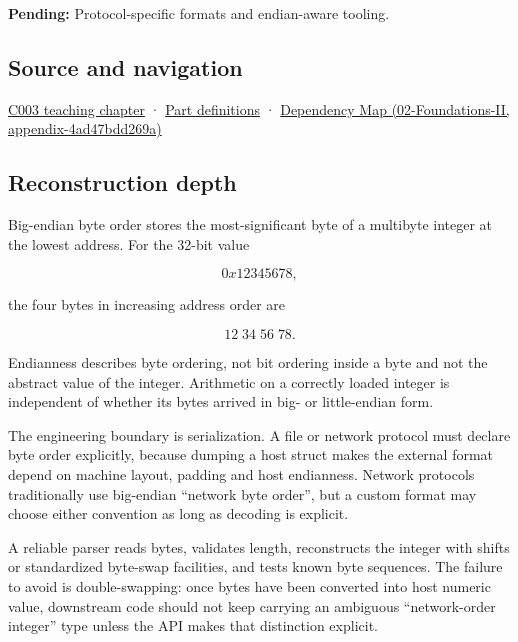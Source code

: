 \textbf{Pending:} Protocol-specific formats and endian-aware tooling.

\subsection{Source and navigation}\label{appendix-92e040df969a-source-and-navigation}

\hyperref[01-foundations-i-ch002-where-the-bytes-live]{C003 teaching chapter} · \hyperref[appendix-fd090d982a15-m003---parts-41-60]{Part definitions} · \href{../02-Foundations-II/main.pdf\#nameddest=appendix-4ad47bdd269a}{Dependency Map (02-Foundations-II, appendix-4ad47bdd269a)}

\subsection{Reconstruction depth}\label{appendix-92e040df969a-reconstruction-depth}

Big-endian byte order stores the most-significant byte of a multibyte integer at the lowest address. For the 32-bit value

\[
0x12345678,
\]

the four bytes in increasing address order are

\[
12\;34\;56\;78.
\]

Endianness describes byte ordering, not bit ordering inside a byte and not the abstract value of the integer. Arithmetic on a correctly loaded integer is independent of whether its bytes arrived in big- or little-endian form.

The engineering boundary is serialization. A file or network protocol must declare byte order explicitly, because dumping a host struct makes the external format depend on machine layout, padding and host endianness. Network protocols traditionally use big-endian ``network byte order'', but a custom format may choose either convention as long as decoding is explicit.

A reliable parser reads bytes, validates length, reconstructs the integer with shifts or standardized byte-swap facilities, and tests known byte sequences. The failure to avoid is double-swapping: once bytes have been converted into host numeric value, downstream code should not keep carrying an ambiguous ``network-order integer'' type unless the API makes that distinction explicit.

